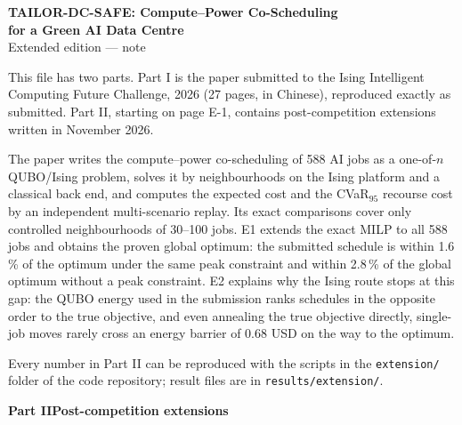 
\graphicspath{{../../figures/extension/}}

\thispagestyle{empty}
\begin{center}
{\Large\bfseries TAILOR-DC-SAFE: Compute--Power Co-Scheduling\\[0.2em] for a Green AI Data Centre}\\[0.7em]
{\large Extended edition --- note}
\end{center}
\vspace{0.8em}

This file has two parts. Part I is the paper submitted to the Ising Intelligent Computing Future Challenge, 2026 (27 pages, in Chinese), reproduced exactly as submitted. Part II, starting on page E-1, contains post-competition extensions written in November 2026.

The paper writes the compute--power co-scheduling of 588 AI jobs as a one-of-$n$ QUBO/Ising problem, solves it by neighbourhoods on the Ising platform and a classical back end, and computes the expected cost and the CVaR$_{95}$ recourse cost by an independent multi-scenario replay. Its exact comparisons cover only controlled neighbourhoods of 30--100 jobs. E1 extends the exact MILP to all 588 jobs and obtains the proven global optimum: the submitted schedule is within 1.6\,\% of the optimum under the same peak constraint and within 2.8\,\% of the global optimum without a peak constraint. E2 explains why the Ising route stops at this gap: the QUBO energy used in the submission ranks schedules in the opposite order to the true objective, and even annealing the true objective directly, single-job moves rarely cross an energy barrier of 0.68 USD on the way to the optimum.

Every number in Part II can be reproduced with the scripts in the \texttt{extension/} folder of the code repository; result files are in \texttt{results/extension/}.

\clearpage
{}

\setcounter{page}{1}
\begin{center}{\Large\bfseries Part II\quad Post-competition extensions}\end{center}

